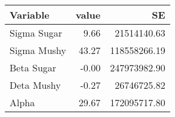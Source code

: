 \begin{tabular}{lrr}
  \hline
Variable & value & SE \\ 
  \hline
Sigma Sugar & 9.66 & 21514140.63 \\ 
  Sigma Mushy & 43.27 & 118558266.19 \\ 
  Beta Sugar & -0.00 & 247973982.90 \\ 
  Deta Mushy & -0.27 & 26746725.82 \\ 
  Alpha & 29.67 & 172095717.80 \\ 
   \hline
\end{tabular}
